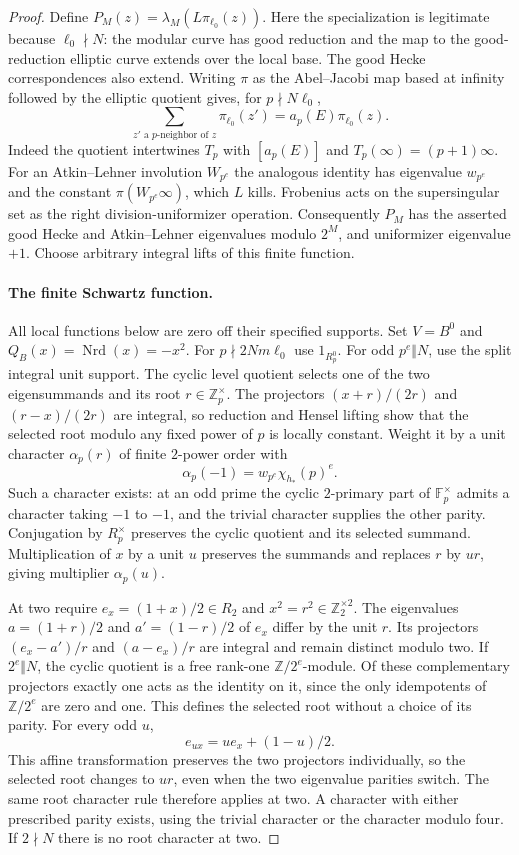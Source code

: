 \documentclass[11pt]{article}
\theoremstyle{definition}
\theoremstyle{remark}
\begin{document}
\begin{proof}
Define $P_M(z)=\lambda_M(L\pi_{\ell_0}(z))$.  Here the specialization is
legitimate because $\ell_0\nmid N$: the modular curve has good
reduction and the map to the good-reduction elliptic curve extends
over the local base.  The good Hecke correspondences also extend.
Writing $\pi$ as the Abel--Jacobi map based at infinity followed by
the elliptic quotient gives, for $p\nmid N\ell_0$,
\[
 \sum_{z'\text{ a }p\text{-neighbor of }z}\pi_{\ell_0}(z')
       =a_p(E)\pi_{\ell_0}(z).
\]
Indeed the quotient intertwines $T_p$ with $[a_p(E)]$ and
$T_p(\infty)=(p+1)\infty$.  For an Atkin--Lehner involution
$W_{p^e}$ the analogous identity has eigenvalue $w_{p^e}$ and the
constant $\pi(W_{p^e}\infty)$, which $L$ kills.  Frobenius acts on
the supersingular set as the right division-uniformizer operation.
Consequently $P_M$ has the asserted good Hecke and Atkin--Lehner
eigenvalues modulo $2^M$, and uniformizer eigenvalue $+1$.
Choose arbitrary integral lifts of this finite function.

\paragraph{The finite Schwartz function.}
All local functions below are zero off their specified supports.
Set $V=B^0$ and $Q_B(x)=\operatorname{Nrd}(x)=-x^2$.
For $p\nmid2Nm\ell_0$ use $1_{R_p^0}$.
For odd $p^e\Vert N$, use the split integral unit support.  The
cyclic level quotient selects one of the two eigensummands and its
root $r\in\mathbb Z_p^\times$.  The projectors
$(x+r)/(2r)$ and $(r-x)/(2r)$ are integral, so reduction and Hensel
lifting show that the selected root modulo any fixed power of $p$
is locally constant.  Weight it by a unit character $\alpha_p(r)$
of finite $2$-power order with
\[
 \alpha_p(-1)=w_{p^e}\chi_{h_*}(p)^e. \tag{O.3}
\]
Such a character exists: at an odd prime the cyclic $2$-primary
part of $\mathbb F_p^\times$ admits a character taking $-1$ to
$-1$, and the trivial character supplies the other parity.
Conjugation by $R_p^\times$ preserves the cyclic quotient and its
selected summand.  Multiplication of $x$ by a unit $u$ preserves
the summands and replaces $r$ by $ur$, giving multiplier
$\alpha_p(u)$.

At two require $e_x=(1+x)/2\in R_2$ and
$x^2=r^2\in\mathbb Z_2^{\times2}$.  The eigenvalues
$a=(1+r)/2$ and $a'=(1-r)/2$ of $e_x$ differ by the unit $r$.
Its projectors $(e_x-a')/r$ and $(a-e_x)/r$ are integral and remain
distinct modulo two.  If $2^e\Vert N$, the cyclic quotient is a
free rank-one $\mathbb Z/2^e$-module.  Of these complementary
projectors exactly one acts as the identity on it, since the only
idempotents of $\mathbb Z/2^e$ are zero and one.  This defines the
selected root without a choice of its parity.  For every odd $u$,
\[
 e_{ux}=u e_x+(1-u)/2.
\]
This affine transformation preserves the two projectors
individually, so the selected root changes to $ur$, even when
the two eigenvalue parities switch.  The same root character rule
therefore applies at two.  A character with either prescribed
parity exists, using the trivial character or the character modulo
four.  If $2\nmid N$ there is no root character at two.


\end{proof}
\end{document}
